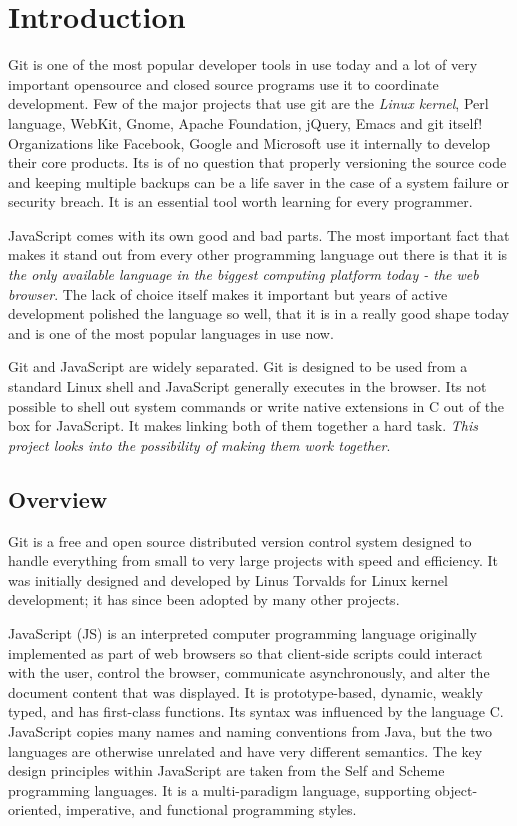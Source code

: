 \chapter{Introduction}

Git\cite{git} is one of the most popular developer tools in use today and a lot
of very important opensource and closed source programs use it to coordinate
development. Few of the major projects that use git are the \textit{Linux
  kernel}, Perl language, WebKit, Gnome, Apache Foundation, jQuery, Emacs and
git itself! Organizations like Facebook, Google and Microsoft use it internally
to develop their core products. Its is of no question that properly versioning
the source code and keeping multiple backups can be a life saver in the case of
a system failure or security breach. It is an essential tool worth learning for
every programmer.

JavaScript\cite{javascript} comes with its own good and bad parts. The most
important fact that makes it stand out from every other programming language out
there is that it is \textit{the only available language in the biggest computing
  platform today - the web browser}. The lack of choice itself makes it
important but years of active development polished the language so well, that it
is in a really good shape today and is one of the most popular languages in use
now.

Git and JavaScript are widely separated. Git is designed to be used from a
standard Linux shell and JavaScript generally executes in the browser. Its not
possible to shell out system commands or write native extensions in C out of the
box for JavaScript. It makes linking both of them together a hard task.
\textit{This project looks into the possibility of making them work together}.

\section{Overview}

Git is a free and open source distributed version control system designed to
handle everything from small to very large projects with speed and efficiency.
It was initially designed and developed by Linus Torvalds for Linux kernel
development; it has since been adopted by many other projects.

JavaScript (JS) is an interpreted computer programming language originally
implemented as part of web browsers so that client-side scripts could interact
with the user, control the browser, communicate asynchronously, and alter the
document content that was displayed. It is prototype-based, dynamic, weakly
typed, and has first-class functions. Its syntax was influenced by the language
C. JavaScript copies many names and naming conventions from Java, but the two
languages are otherwise unrelated and have very different semantics. The key
design principles within JavaScript are taken from the Self and Scheme
programming languages. It is a multi-paradigm language, supporting
object-oriented, imperative, and functional programming styles.

